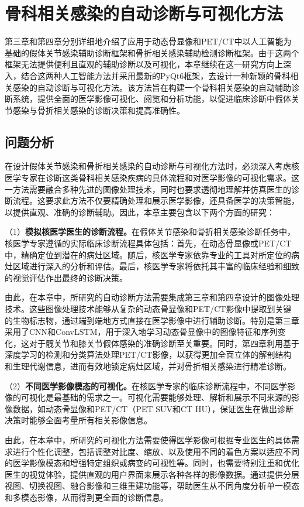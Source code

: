 \chapter{骨科相关感染的自动诊断与可视化方法}

第三章和第四章分别详细地介绍了应用于动态骨显像和PET/CT中以人工智能为基础的假体关节感染辅助诊断框架和骨折相关感染辅助检测诊断框架。由于这两个框架无法提供便利且直观的辅助诊断以及可视化，本章继续在这一研究方向上深入，结合这两种人工智能方法并采用最新的PyQt6框架，去设计一种新颖的骨科相关感染的自动诊断与可视化方法。该方法旨在构建一个骨科相关感染的自动辅助诊断系统，提供全面的医学影像可视化、阅览和分析功能，以促进临床诊断中假体关节感染与骨折相关感染的诊断决策和提高准确性。

\section{问题分析}

在设计假体关节感染和骨折相关感染的自动诊断与可视化方法时，必须深入考虑核医学专家在诊断这类骨科相关感染疾病的具体流程和对医学影像的可视化需求。这一方法需要融合多种先进的图像处理技术，同时也要求透彻地理解并仿真医生的诊断流程。这要求此方法不仅要精确处理和展示医学影像，还具备医学的决策智能，以提供直观、准确的诊断辅助。因此，本章主要包含以下两个方面的研究：

（1）\textbf{模拟核医学医生的诊断流程。}在假体关节感染和骨折相关感染诊断任务中，核医学专家遵循的实际临床诊断流程具体包括：首先，在动态骨显像或PET/CT中，精确定位到潜在的病灶区域。随后，核医学专家依靠专业的工具对所定位的病灶区域进行深入的分析和评估。最后，核医学专家将依托其丰富的临床经验和细致的视觉评估作出最终的诊断决策。

由此，在本章中，所研究的自动诊断方法需要集成第三章和第四章设计的图像处理技术。这些图像处理技术能够从复杂的动态骨显像和PET/CT影像中提取到关键的生物标志物，通过端到端地方式直接在医学影像中进行辅助诊断。特别是第三章采用了CNN和ConvLSTM，用于深入地学习动态骨显像中的图像特征和序列变化，这对于髋关节和膝关节假体感染的准确诊断至关重要。同时，第四章利用基于深度学习的检测和分类算法处理PET/CT影像，以获得更加全面立体的解剖结构和生理代谢信息，进而有效地锁定病灶区域，并对骨折相关感染进行精准诊断。

（2）\textbf{不同医学影像模态的可视化。}在核医学专家的临床诊断流程中，不同医学影像的可视化是最基础的需求之一。可视化需要能够处理、解析和展示不同来源的影像数据，如动态骨显像和PET/CT（PET SUV和CT HU），保证医生在做出诊断决策时能够全面考量所有相关影像信息。

由此，在本章中，所研究的可视化方法需要使得医学影像可根据专业医生的具体需求进行个性化调整，包括调整对比度、缩放、以及使用不同的着色方案以适应不同的医学影像模态和增强特定组织或病变的可视性等。同时，也需要特别注重和优化医生的视觉体验，提供直观的用户界面来展示各种各样的影像数据。通过提供分层视图、切换视图、融合影像和三维重建功能等，帮助医生从不同角度分析单一模态和多模态影像，从而得到更全面的诊断信息。

